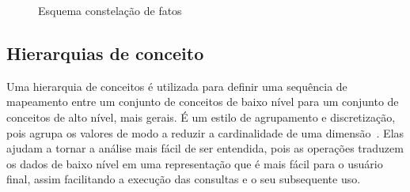 \begin{figure}[!htb]
	\caption{Esquema constelação de fatos}\label{fig:factconstschema}
	\vspace{6mm}
	\begin{center}
	\end{center}
	\vspace{2mm}
	\legenda{}
\end{figure}

\subsection{Hierarquias de conceito}\label{ch:fun:cube:concept}

Uma hierarquia de conceitos é utilizada para definir uma sequência de mapeamento entre um conjunto de conceitos de baixo nível para um conjunto de conceitos de alto nível, mais gerais.
É um estilo de agrupamento e discretização, pois agrupa os valores de modo a reduzir a cardinalidade de uma dimensão~\cite{hanDataMiningConcepts2011}.
Elas ajudam a tornar a análise mais fácil de ser entendida, pois as operações traduzem os dados de baixo nível em uma representação que é mais fácil para o usuário final, assim facilitando a execução das consultas e o seu subsequente uso.

